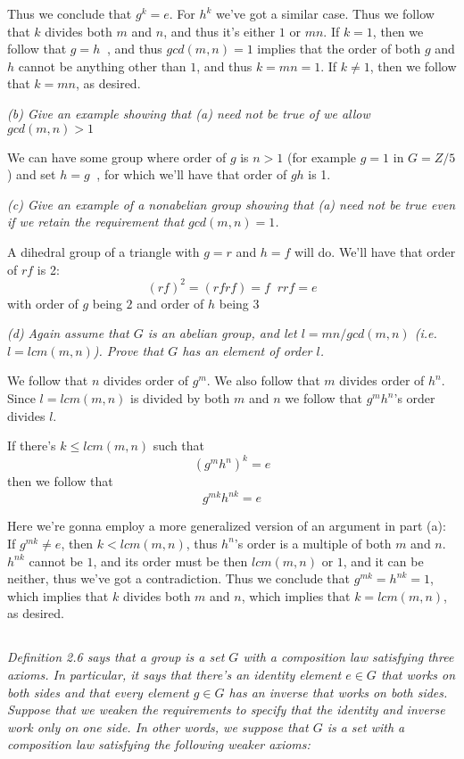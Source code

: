 \documentclass[11pt,oneside,titlepage]{book}
\DeclareMathOperator \inv {^{-1}}
\begin{document}
Thus we conclude that $g^k = e$. For $h^k$ we've got a similar
case. Thus we follow that $k$ divides both $m$ and $n$, and thus it's
either $1$ or $mn$. If $k = 1$, then we follow that $g = h\inv$, and
thus $gcd(m, n) = 1$ implies that the order of both $g$ and $h$ cannot
be anything other than $1$, and thus $k = mn = 1$.
If $k \neq 1$, then we follow that $k = mn$, as desired.

\textit{(b) Give an example showing that (a) need not be true of we
allow $gcd(m, n) > 1$}

We can have some group where order of $g$ is $n > 1$ (for example $g =
1$ in $G = Z/5$) and set $h = g\inv$, for which we'll have that order
of $gh$ is 1.

\textit{(c) Give an example of a nonabelian group showing that (a) need not
  be true even if we retain the requirement that $gcd(m, n) = 1$.}

A dihedral group of a triangle with $g = r$ and $h = f$ will do. We'll have that
order of $rf$ is 2:
$$(rf)^2 = (rfrf) = f\inv r r f = e$$
with order of $g$ being $2$ and order of $h$ being $3$

\textit{(d) Again assume that $G$ is an abelian group, and let $l = mn
  / gcd(m, n)$ (i.e.  $l = lcm(m, n)$). Prove that $G$ has an element
  of order $l$.}

We follow that $n$ divides order of $g^m$. We also follow that $m$
divides order of $h^n$.  Since $l = lcm(m, n)$ is divided by both $m$
and $n$ we follow that $g^m h^n$'s order divides $l$.

If there's $k \leq lcm(m, n)$ such that
$$(g^m h^n)^k = e$$
then we follow that
$$g^{mk} h^{nk} = e$$

Here we're gonna employ a more generalized version of an argument in part (a):
If $g^{mk} \neq e$, then $k < lcm(m, n)$, thus  $h^{n}$'s order is a
multiple of both $m$ and $n$. $h^{nk}$ cannot be $1$, and its order
must be then $lcm(m, n)$ or $1$, and it can be neither, thus we've got
a contradiction. Thus we conclude that $g^{mk} = h^{nk} = 1$, which implies that $k$
divides both $m$ and $n$, which implies that $k = lcm(m, n)$, as desired.

\subsection{}

\textit{Definition 2.6 says that a group is a set $G$ with a
composition law satisfying three axioms.  In particular, it says that
there's an identity element $e \in G$ that works on both sides and
that every element $g \in G$ has an inverse that works on both
sides. Suppose that we weaken the requirements to specify that the
identity and inverse work only on one side. In other words, we suppose
that $G$ is a set with a composition law satisfying the following
weaker axioms: }
\end{document}
